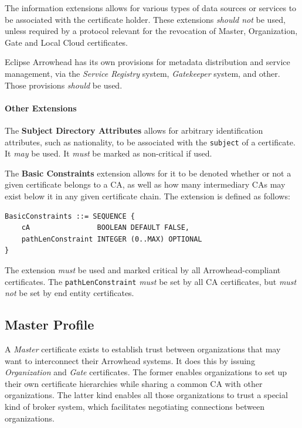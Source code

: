 The information extensions allows for various types of data sources or services to be associated with the certificate holder.
These extensions \textit{should not} be used, unless required by a protocol relevant for the revocation of Master, Organization, Gate and Local Cloud certificates.

Eclipse Arrowhead has its own provisions for metadata distribution and service management, via the \textit{Service Registry} system, \textit{Gatekeeper} system, and other.
Those provisions \textit{should} be used.

\paragraph{Other Extensions}

The \textbf{Subject Directory Attributes} allows for arbitrary identification attributes, such as nationality, to be associated with the \texttt{subject} of a certificate.
It \textit{may} be used.
It \textit{must} be marked as non-critical if used.

The \textbf{Basic Constraints} extension allows for it to be denoted whether or not a given certificate belongs to a CA, as well as how many intermediary CAs may exist below it in any given certificate chain.
The extension is defined as follows:

\newpage

\begin{verbatim}
BasicConstraints ::= SEQUENCE {
    cA                BOOLEAN DEFAULT FALSE,
    pathLenConstraint INTEGER (0..MAX) OPTIONAL
}
\end{verbatim}

The extension \textit{must} be used and marked critical by all Arrowhead-compliant certificates.
The \texttt{pathLenConstraint} \textit{must} be set by all CA certificates, but \textit{must not} be set by end entity certificates.

\newpage
\subsection{Master Profile}

A \textit{Master} certificate exists to establish trust between organizations that may want to interconnect their Arrowhead systems.
It does this by issuing \textit{Organization} and \textit{Gate} certificates.
The former enables organizations to set up their own certificate hierarchies while sharing a common CA with other organizations.
The latter kind enables all those organizations to trust a special kind of broker system, which facilitates negotiating connections between organizations.

